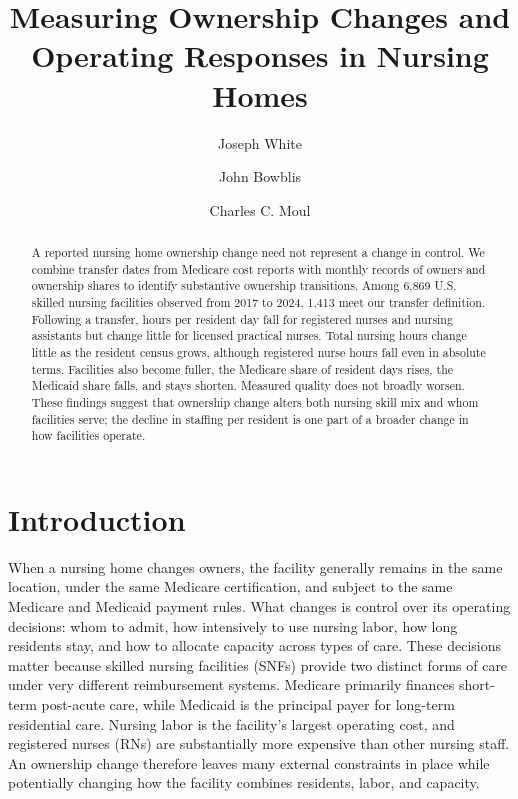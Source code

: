 \documentclass[12pt]{article}
\begin{document}
\begin{titlepage}
\title{Measuring Ownership Changes and Operating Responses in Nursing Homes}

\author{
  Joseph White
  \and
  John Bowblis
  \and
  Charles C. Moul
}

\date{\DTMtoday}

\maketitle

\begin{abstract}
\noindent A reported nursing home ownership change need not represent a change in control. We combine transfer dates from Medicare cost reports with monthly records of owners and ownership shares to identify substantive ownership transitions. Among 6,869 U.S. skilled nursing facilities observed from 2017 to 2024, 1,413 meet our transfer definition. Following a transfer, hours per resident day fall for registered nurses and nursing assistants but change little for licensed practical nurses. Total nursing hours change little as the resident census grows, although registered nurse hours fall even in absolute terms. Facilities also become fuller, the Medicare share of resident days rises, the Medicaid share falls, and stays shorten. Measured quality does not broadly worsen. These findings suggest that ownership change alters both nursing skill mix and whom facilities serve; the decline in staffing per resident is one part of a broader change in how facilities operate.

\bigskip
\end{abstract}
\setcounter{page}{0}
\thispagestyle{empty}
\end{titlepage}
\pagebreak \newpage

\doublespacing

\section{Introduction} \label{sec:introduction}

When a nursing home changes owners, the facility generally remains in the same location, under the same Medicare certification, and subject to the same Medicare and Medicaid payment rules. What changes is control over its operating decisions: whom to admit, how intensively to use nursing labor, how long residents stay, and how to allocate capacity across types of care. These decisions matter because skilled nursing facilities (SNFs) provide two distinct forms of care under very different reimbursement systems. Medicare primarily finances short-term post-acute care, while Medicaid is the principal payer for long-term residential care. Nursing labor is the facility's largest operating cost, and registered nurses (RNs) are substantially more expensive than other nursing staff. An ownership change therefore leaves many external constraints in place while potentially changing how the facility combines residents, labor, and capacity.
\end{document}
